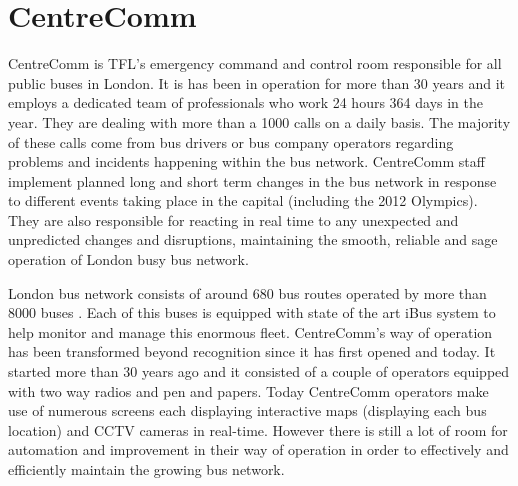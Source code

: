 \section{CentreComm}
CentreComm is TFL's emergency command and control room responsible for all public buses in London. It is has been in operation for more than 30 years \cite{centreComm} and it employs a dedicated
team of professionals who work 24 hours 364 days in the year. They are dealing with more than a 1000 calls on a daily basis. The majority of these calls come from bus drivers or bus company operators regarding problems and incidents happening within the bus network. CentreComm staff implement planned long and short term changes in the bus network in response to different events taking place in the capital (including the 2012 Olympics). They are also responsible for reacting in real time to any unexpected and unpredicted changes and disruptions, maintaining the smooth, reliable and sage operation of London busy bus network.

London bus network consists of around 680 bus routes operated by more than 8000 buses \cite{glads}. Each of this buses is equipped with state of the art iBus system to help monitor and manage this enormous fleet. CentreComm's way of operation has been transformed beyond recognition since it has first opened and today. It started more than 30 years ago \cite{centreComm} and it consisted of a couple of operators equipped with two way radios and pen and papers. Today CentreComm operators make use of numerous screens each displaying interactive maps (displaying each bus location) and CCTV cameras in real-time. However there is still a lot of room for automation and improvement in their way of operation in order to effectively and efficiently maintain the growing bus network.

